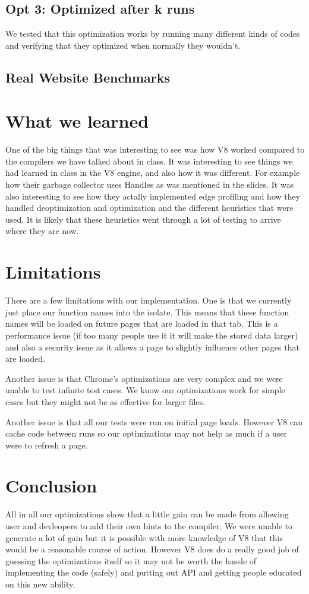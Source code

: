 \documentclass[twocolumn,showpacs,%
  nofootinbib,aps,superscriptaddress,%
  eqsecnum,prd,notitlepage,showkeys,10pt]{revtex4-1}
\begin{document}
\subsection{Opt 3: Optimized after k runs}
We tested that this optimization works by running many different kinds of codes and verifying that they optimized when normally they wouldn't. 


\subsection{Real Website Benchmarks}


\section {What we learned}
One of the big things that was interesting to see was how V8 worked compared to the compilers we have talked about in class. It was interesting to see things we had learned in class in the V8 engine, and also how it was different. For example how their garbage collector uses Handles as was mentioned in the slides. It was also interesting to see how they actally implemented edge profiling and how they handled deoptimization and optimization and the different heuristics that were used. It is likely that these heuristics went through a lot of testing to arrive where they are now.


\section{Limitations}
There are a few limitations with our implementation. One is that we currently just place our function names into the isolate. This means that these function names will be loaded on future pages that are loaded in that tab. This is a performance issue (if too many people use it it will make the stored data larger) and also a security issue as it allows a page to slightly influence other pages that are loaded.

Another issue is that Chrome's optimizations are very complex and we were unable to test infinite test cases. We know our optimizations work for simple cases but they might not be as effective for larger files. 

Another issue is that all our tests were run on initial page loads. However V8 can cache code between runs so our optimizations may not help as much if a user were to refresh a page.


\section{Conclusion}
All in all our optimizations show that a little gain can be made from allowing user and devleopers to add their own hints to the compiler. We were unable to generate a lot of gain but it is possible with more knowledge of V8 that this would be a reasonable course of action. However V8 does do a really good job of guessing the optimizations itself so it may not be worth the hassle of implementing the code (safely) and putting out API and getting people educated on this new ability. 
\end{document}
